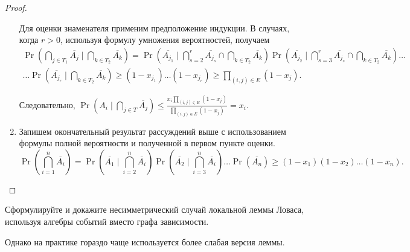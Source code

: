 \begin{proof}
\begin{enumerate}
		Для оценки знаменателя применим предположение индукции. В случаях, когда $ r > 0 $, используя формулу умножения вероятностей, получаем
		\begin{multline*}
			\Pr\left(\bigcap\limits_{j \in T_1}\overline{A_j}\mid\bigcap\limits_{k \in T_2}\overline{A_k}\right) = 
			\Pr\left(\overline{A_{j_1}}\mid\bigcap\limits_{s = 2}^{r}\overline{A_{j_s}} \cap \bigcap\limits_{k \in T_2}\overline{A_k}\right)
			\Pr\left(\overline{A_{j_2}}\mid\bigcap\limits_{s = 3}^{r}\overline{A_{j_s}} \cap \bigcap\limits_{k \in T_2}\overline{A_k}\right) \ldots \\ \ldots \Pr\left(\overline{A_{j_r}}\mid\bigcap\limits_{k \in T_2}\overline{A_k}\right) \geq
			(1 - x_{j_1}) \ldots (1 - x_{j_r}) \geq \prod\limits_{(i, j) \in E}(1 - x_j). 
		\end{multline*}
		
		Следовательно, 
		\(
		\Pr\left(A_i\mid \bigcap\limits_{j \in T}\overline{A_j}\right) \leq
		\frac{x_i\prod\limits_{(i, j) \in E}(1 - x_j)}
		{\prod\limits_{(i, j) \in E}(1 - x_j)} = x_i.
		\)
		
		\item 
		Запишем окончательный результат рассуждений выше с использованием формулы полной вероятности и полученной в первом пункте оценки.
		\[
		\Pr\left(\bigcap\limits_{i = 1}^{n} \overline{A_i}\right) = \Pr\left(\overline{A_1}\mid\bigcap\limits_{i = 2}^{n}\overline{A_i}\right) 
		\Pr\left(\overline{A_2}\mid\bigcap\limits_{i = 3}^{n}\overline{A_i}\right)
		\ldots \Pr\left(\overline{A_n}\right) \geq (1 - x_1)(1 - x_2) \ldots (1 - x_n).		
		\] 
	\end{enumerate}

\end{proof}
\begin{exercise}
    Сформулируйте и докажите несимметрический случай локальной леммы Ловаса, используя алгебры событий вместо графа зависимости.
\end{exercise}

Однако на практике гораздо чаще используется более слабая версия леммы.

